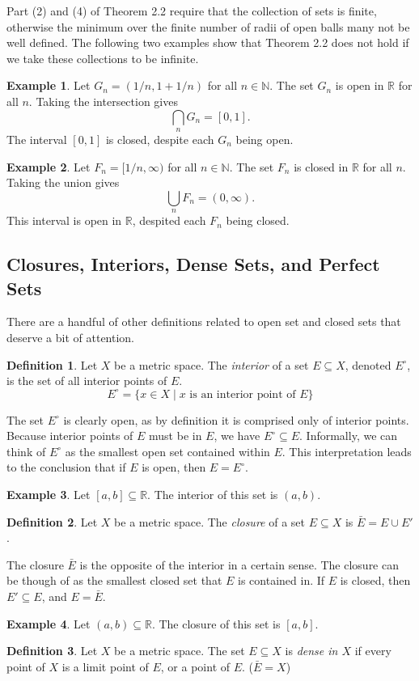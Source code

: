 \documentclass{article}
\newcommand{\N}{\mathbb{N}}
\newcommand{\R}{\mathbb{R}}
\theoremstyle{definition}
\newtheorem{definition}{Definition}[section]
\newtheorem{example}{Example}[section]
\begin{document}
	Part (2) and (4) of Theorem 2.2 require that the collection of sets is finite, otherwise the minimum over the finite number of radii of open balls many not be well defined. The following two examples show that Theorem 2.2 does not hold if we take these collections to be infinite. 
	\begin{example}
		Let $ G_n=(1/n,1+1/n) $ for all $ n\in\N $. The set $ G_n $ is open in $ \R $ for all $ n $. Taking the intersection gives $$\bigcap_n G_n=[0,1] .$$ The interval $ [0,1] $ is closed, despite each $ G_n $ being open.  
	\end{example}
	\begin{example}
		Let $ F_n=[1/n,\infty) $ for all $ n\in\N $. The set $ F_n $ is closed in $ \R $ for all $ n $. Taking the union gives $$ \bigcup_{n}F_n=(0,\infty).$$ This interval is open in $ \R $, despited each $ F_n $ being closed.
	\end{example}
	\subsection{Closures, Interiors, Dense Sets, and Perfect Sets} 
	There are a handful of other definitions related to open set and closed sets that deserve a bit of attention.
	\begin{definition}\label{def2.13}
		Let $ X $ be a metric space. The \textit{\color{red}interior} of a set $ E\subseteq X $, denoted $ E^\circ $, is the set of all interior points of $ E $. $$ E^\circ=\{x\in X\mid x\text{ is an interior point of }E \} $$
	\end{definition}
	The set $ E^\circ $ is clearly open, as by definition it is comprised only of interior points. Because interior points of $ E $ must be in $ E $, we have $ E^\circ \subseteq E $. Informally, we can think of $ E^\circ $ as the smallest open set contained within $ E $. This interpretation leads to the conclusion that if $ E $ is open, then $ E=E^\circ $.
	\begin{example}
		Let $ [a,b]\subseteq\R $. The interior of this set is $ (a,b) $. 
	\end{example}
	\begin{definition}\label{def2.14}
		Let $ X $ be a metric space. The \textit{\color{red}closure} of a set $ E\subseteq X $ is $ \bar{E}=E\cup E' $. 
	\end{definition}
	The closure $ \bar{E} $ is the opposite of the interior in a certain sense. The closure can be though of as the smallest closed set that $ E $ is contained in. If $ E $ is closed, then $ E'\subseteq E $, and $ E=\bar{E} $.
	\begin{example}
		Let $ (a,b)\subseteq\R $. The closure of this set is $ [a,b] $. 
	\end{example}
	\begin{definition}\label{def2.15}
		Let $ X $ be a metric space. The set $ E\subseteq X $ is \textit{\color{red}dense in $ X $} if every point of $ X $ is a limit point of $ E $, or a point of $ E $. ($ \bar{E}=X $)  
	\end{definition}
	
\end{document}

